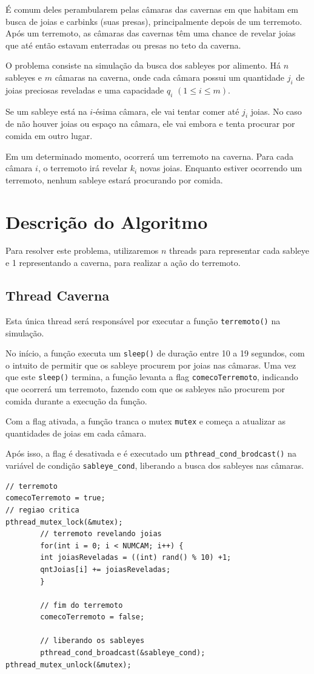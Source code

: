 \documentclass{article}
\begin{document}
É comum deles perambularem pelas câmaras das cavernas em que habitam em busca de joias e carbinks (suas presas), principalmente depois de um terremoto. Após um terremoto, as câmaras das cavernas têm uma chance de revelar joias que até então estavam enterradas ou presas no teto da caverna.

O problema consiste na simulação da busca dos sableyes por alimento. Há $n$ sableyes e $m$ câmaras na caverna, onde cada câmara possui um quantidade $j_i$ de joias preciosas reveladas e uma capacidade $q_i$ $(1 \leq i \leq m)$.

Se um sableye está na $i$-ésima câmara, ele vai tentar comer até $j_i$ joias. No caso de não houver joias ou espaço na câmara, ele vai embora e tenta procurar por comida em outro lugar.

Em um determinado momento, ocorrerá um terremoto na caverna. Para cada câmara $i$, o terremoto irá revelar $k_i$ novas joias. Enquanto estiver ocorrendo um terremoto, nenhum sableye estará procurando por comida.

\section{Descrição do Algoritmo}
Para resolver este problema, utilizaremos $n$ threads para representar cada sableye e 1 representando a caverna, para realizar a ação do terremoto. 

\subsection{Thread Caverna}
Esta única thread será responsável por executar a função \verb|terremoto()| na simulação. 

No início, a função executa um \verb|sleep()| de duração entre 10 a 19 segundos, com o intuito de permitir que os sableye procurem por joias nas câmaras. Uma vez que este \verb|sleep()| termina, a função levanta a flag \verb|comecoTerremoto|, indicando que ocorrerá um terremoto, fazendo com que os sableyes não procurem por comida durante a execução da função.

Com a flag ativada, a função tranca o mutex \verb|mutex| e começa a atualizar as quantidades de joias em cada câmara.

Após isso, a flag é desativada e é executado um \verb|pthread_cond_brodcast()| na variável de condição \verb|sableye_cond|, liberando a busca dos sableyes nas câmaras. 
\begin{lstlisting}
// terremoto
comecoTerremoto = true;
// regiao critica
pthread_mutex_lock(&mutex);
        // terremoto revelando joias  
        for(int i = 0; i < NUMCAM; i++) {
        int joiasReveladas = ((int) rand() % 10) +1;
        qntJoias[i] += joiasReveladas;
        }

        // fim do terremoto
        comecoTerremoto = false;
        
        // liberando os sableyes 
        pthread_cond_broadcast(&sableye_cond);
pthread_mutex_unlock(&mutex);    
\end{lstlisting}
\end{document}
